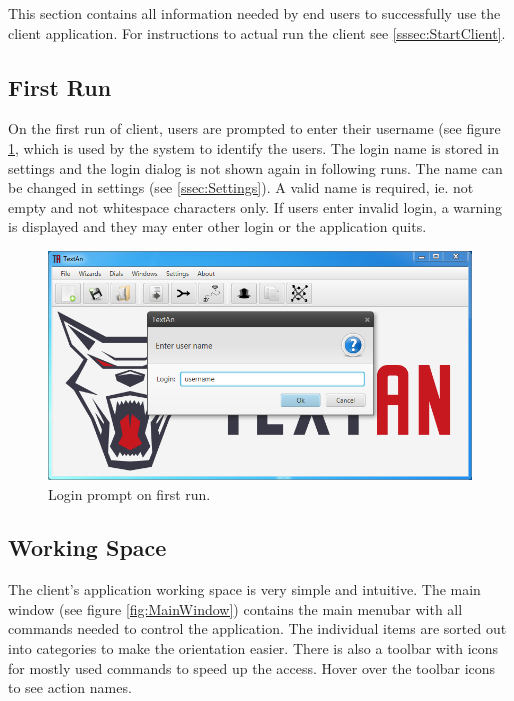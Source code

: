This section contains all information needed by end users to successfully use
the \textan{} client application. For instructions to actual run the client
see \ref{sssec:StartClient}.

\subsection{First Run}

On the first run of \textan{} client, users are prompted to enter their username
(see figure \ref{fig:Login}, which is used by the system to identify the users.
The login name is stored in settings and the login dialog is not shown again
in following runs. The name can be changed in settings (see \ref{ssec:Settings}). A
valid name is required, ie. not empty and not whitespace characters only. If
users enter invalid login, a warning is displayed and they may enter other
login or the application quits.

\begin{figure}[!htb]
        \centering
        \includegraphics[width=\textwidth]{Images/login}
        \caption{Login prompt on first run.}
        \label{fig:Login}
\end{figure}

\subsection{Working Space}

The \textan{} client's application working space is very simple and intuitive.
The main window (see figure \ref{fig:MainWindow}) contains the main menubar with
all commands needed to control the application. The individual items are sorted
out into categories to make the orientation easier. There is also a toolbar with
icons for mostly used commands to speed up the access. Hover over the
toolbar icons to see action names.

